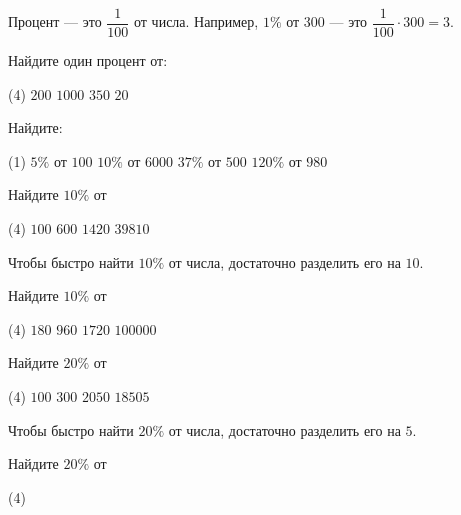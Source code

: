 %
%

\begin{class}[number=1]
		\begin{definit}
			Процент --- это \( \dfrac{1}{100} \) от числа. Например, \( 1\% \) от \( 300 \) --- это \( \dfrac{1}{100}\cdot300=3 \).
		\end{definit}
		\begin{listofex}
		\item Найдите один процент от:
		\begin{tasks}(4)
			\task \( 200 \)
			\task \( 1000 \)
			\task \( 350 \)
			\task \( 20 \)
		\end{tasks}
		\item Найдите:
		\begin{tasks}(1)
			\task \( 5\% \) от \( 100 \)
			\task \( 10\% \) от \( 6000 \)
			\task \( 37\% \) от \( 500 \)
			\task \( 120\% \) от \( 980 \)
		\end{tasks}
		\item Найдите \( 10\% \) от
		\begin{tasks}(4)
			\task \( 100 \)
			\task \( 600 \)
			\task \( 1420 \)
			\task \( 39810 \)
		\end{tasks} 
	\end{listofex}
		\begin{definit}
			Чтобы быстро найти \( 10\% \) от числа, достаточно разделить его на \( 10 \).
		\end{definit}
	\begin{listofex}[resume]
		\item Найдите \( 10\% \) от
		\begin{tasks}(4)
			\task \( 180 \)
			\task \( 960 \)
			\task \( 1720 \)
			\task \( 100000 \)
		\end{tasks}
		\item Найдите \( 20\% \) от 
		\begin{tasks}(4)
			\task \( 100 \)
			\task \( 300 \)
			\task \( 2050 \)
			\task \( 18505 \)
		\end{tasks}
		\end{listofex}
		\begin{definit}
		Чтобы быстро найти \( 20\% \) от числа, достаточно разделить его на \( 5 \).
		\end{definit}	
		\begin{listofex}[resume]
		\item Найдите \( 20\% \) от
		\begin{tasks}(4)

\end{tasks}
\end{listofex}
\end{class}
